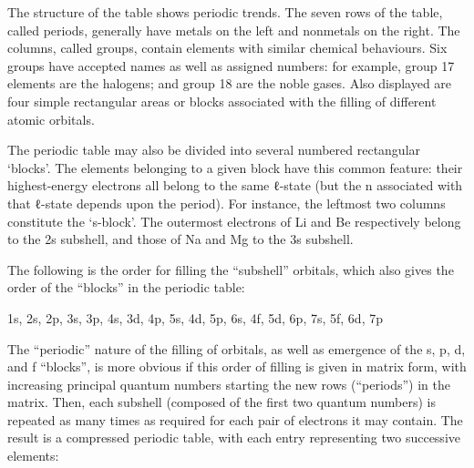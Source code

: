 The structure of the table shows periodic trends. The seven rows of the
table, called periods, generally have metals on the left and nonmetals
on the right. The columns, called groups, contain elements with similar
chemical behaviours. Six groups have accepted names as well as assigned
numbers: for example, group 17 elements are the halogens; and group 18
are the noble gases. Also displayed are four simple rectangular areas or
blocks associated with the filling of different atomic orbitals.

The periodic table may also be divided into several numbered rectangular
`blocks'. The elements belonging to a given block have this common
feature: their highest-energy electrons all belong to the same ℓ-state
(but the n associated with that ℓ-state depends upon the period). For
instance, the leftmost two columns constitute the `s-block'. The
outermost electrons of Li and Be respectively belong to the 2s subshell,
and those of Na and Mg to the 3s subshell.

The following is the order for filling the ``subshell'' orbitals, which
also gives the order of the ``blocks'' in the periodic table:

1s, 2s, 2p, 3s, 3p, 4s, 3d, 4p, 5s, 4d, 5p, 6s, 4f, 5d, 6p, 7s, 5f, 6d,
7p

The ``periodic'' nature of the filling of orbitals, as well as emergence
of the s, p, d, and f ``blocks'', is more obvious if this order of
filling is given in matrix form, with increasing principal quantum
numbers starting the new rows (``periods'') in the matrix. Then, each
subshell (composed of the first two quantum numbers) is repeated as many
times as required for each pair of electrons it may contain. The result
is a compressed periodic table, with each entry representing two
successive elements:

